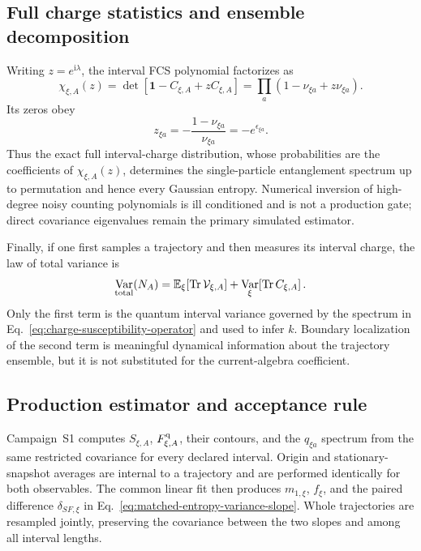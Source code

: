 \documentclass[aps,prx,onecolumn,nofootinbib,superscriptaddress,longbibliography]{revtex4-2}
\DeclareMathOperator{\Var}{Var}
\newcommand{\ii}{\boldsymbol{\mathrm{i}}}
\newcommand{\Id}{\mathbf{1}}
\newcommand{\E}{\mathbb{E}}
\newcommand{\qTr}{\operatorname{Tr}}
\begin{document}
\subsection{Full charge statistics and ensemble decomposition}

Writing $z=e^{\ii\lambda}$, the interval FCS polynomial factorizes as
\begin{equation}
 \chi_{\xi,A}(z)
 =\det[\Id-C_{\xi,A}+zC_{\xi,A}]
 =\prod_a(1-\nu_{\xi a}+z\nu_{\xi a}).
 \label{eq:fcs-polynomial-factorization}
\end{equation}
Its zeros obey
\begin{equation}
 z_{\xi a}=-\frac{1-\nu_{\xi a}}{\nu_{\xi a}}
 =-e^{\epsilon_{\xi a}}.
 \label{eq:fcs-zero-entanglement-spectrum}
\end{equation}
Thus the exact full interval-charge distribution, whose probabilities are the coefficients
of $\chi_{\xi,A}(z)$, determines the single-particle entanglement spectrum up to
permutation and hence every Gaussian entropy.  Numerical inversion of high-degree noisy
counting polynomials is ill conditioned and is not a production gate; direct covariance
eigenvalues remain the primary simulated estimator.

Finally, if one first samples a trajectory and then measures its interval charge, the law
of total variance is
\begin{equation}
 \Var_{\rm total}(N_A)
 =\E_\xi\!\left[\qTr\mathcal V_{\xi,A}\right]
 +\Var_\xi\!\left[\qTr C_{\xi,A}\right].
 \label{eq:appendix-total-variance-spectrum}
\end{equation}
Only the first term is the quantum interval variance governed by the spectrum in
Eq.~\eqref{eq:charge-susceptibility-operator} and used to infer $k$.  Boundary localization
of the second term is meaningful dynamical information about the trajectory ensemble, but
it is not substituted for the current-algebra coefficient.

\subsection{Production estimator and acceptance rule}

Campaign~S1 computes $S_{\xi,A}$, $F_{\xi,A}^{\rm q}$, their contours, and the
$q_{\xi a}$ spectrum from the same restricted covariance for every declared interval.
Origin and stationary-snapshot averages are internal to a trajectory and are performed
identically for both observables.  The common linear fit then produces
$m_{1,\xi}$, $f_\xi$, and the paired difference $\delta_{SF,\xi}$ in
Eq.~\eqref{eq:matched-entropy-variance-slope}.  Whole trajectories are resampled jointly,
preserving the covariance between the two slopes and among all interval lengths.
\end{document}
